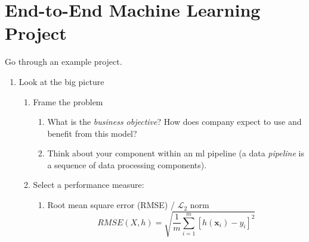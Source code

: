 \documentclass[12pt,oneside,a4paper]{article}
\numberwithin{equation}{section}
\newcommand{\bfx}{\boldsymbol{x}}
\begin{document}
\section{End-to-End Machine Learning Project}
Go through an example project. 
\begin{enumerate}
\item Look at the big picture 
\begin{enumerate}
\item Frame the problem
\begin{enumerate}
\item What is the \emph{business objective}? How does company expect to use and benefit from this model? 
\item Think about your component within an ml pipeline (a data \emph{pipeline} is a sequence of data processing components).
\end{enumerate}
\item Select a performance measure: 
\begin{enumerate}
\item Root mean square error (RMSE) / $\mathcal{L}_2$ norm
\begin{equation}
RMSE(X, h) = \sqrt{\frac{1}{m} \sum_{i=1}^{m}\left[h(\bfx_{i}) - y_{i}\right]^2}
\end{equation}


\end{enumerate}
\end{enumerate}
\end{enumerate}
\end{document}
